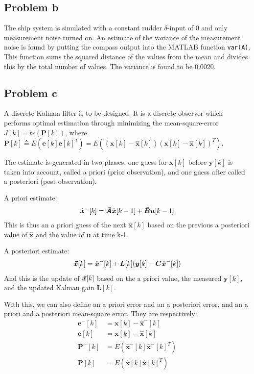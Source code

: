 \subsection{Problem b}
The ship system is simulated with a constant rudder $\delta$-input of 0 and only measurement noise turned on. An estimate of the variance of 
the measurement noise is found by putting the compass output into the MATLAB function {\texttt{var(A)}}. This function sums the squared distance of the values from the mean and divides this by the total number of values. The variance 
is found to be 0.0020.

\subsection{Problem c}
A discrete Kalman filter is to be designed. It is a discrete observer which performs optimal estimation through minimizing the mean-square-error $J[k] = tr(\bm{P}[k])$, where
$\bm{P}[k] \triangleq E(\bm{e}[k]\bm{e}[k]^T) = E((\bm{x}[k] - \hat{\bm{x}}[k])(\bm{x}[k] - \hat{\bm{x}}[k])^T)$.

The estimate is generated in two phases, one guess for $\bm{x}[k]$ before $\bm{y}[k]$ is taken into account, called a priori (prior observation), and one guess after called a posteriori (post observation).

A priori estimate:
\begin{equation}
\hat{\bm{x}}^-[k] = \thickbar{\bm{A}}\hat{\bm{x}}[k-1]+\thickbar{\bm{B}}\bm{u}[k-1]
\end{equation}
This is thus an a priori guess of the next $\hat{\bm{x}}[k]$ based on the previous a posteriori value of $\hat{\bm{x}}$ and the value of $\bm{u}$ at time k-1.

A posteriori estimate:
\begin{equation}
\thickbar{\bm{x}}[k] = \hat{\bm{x}}^-[k] + \bm{L}[k](\bm{y}[k] - \bm{C}\hat{\bm{x}}^-[k])
\end{equation}
And this is the update of $\thickbar{\bm{x}}[k]$ based on the a priori value, the measured $\bm{y}[k]$, and the updated Kalman gain $\bm{L}[k]$.

With this, we can also define an a priori error and an a posteriori error, and an a priori and a posteriori mean-square error. They are respectively:
\begin{align}
\bm{e}^-[k] &= \bm{x}[k] - \hat{\bm{x}}^-[k] \\
\bm{e}[k] &= \bm{x}[k] - \hat{\bm{x}}[k] \\
\bm{P}^-[k] &= E(\hat{\bm{x}}^-[k]\hat{\bm{x}}^-[k]^T) \\
\bm{P}[k] &= E(\hat{\bm{x}}[k]\hat{\bm{x}}[k]^T)
\end{align}

